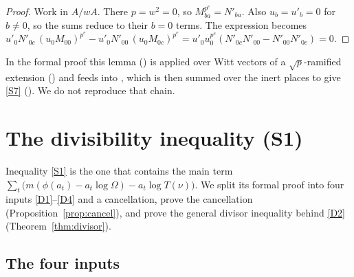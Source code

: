 \documentclass[11pt]{amsart}
\theoremstyle{plain}
\theoremstyle{definition}
\numberwithin{equation}{section}
\begin{document}
\begin{proof}
Work in $A/wA$. There $p=w^2=0$, so $M_{ba}^{p^e}=N'_{ba}$. Also $u_b=u'_b=0$ for $b\ne0$, so the
sums reduce to their $b=0$ terms. The expression becomes
$u'_0N'_{0c}\,(u_0M_{00})^{p^e}-u'_0N'_{00}\,(u_0M_{0c})^{p^e}=u'_0u_0^{p^e}(N'_{0c}N'_{00}-N'_{00}N'_{0c})=0$.
\end{proof}

In the formal proof this lemma () is applied over Witt vectors of a
$\sqrt p$-ramified extension () and feeds into , which is then summed over
the inert places to give \ref{S7} (). We do not reproduce that
chain.
\section{The divisibility inequality (S1)}\label{sec:S1}

Inequality \ref{S1} is the one that contains the main term
$\sum_t\bigl(m(\phi(a_t)-a_t\log\Omega)-a_t\log T(\nu)\bigr)$. We split its formal proof into four
inputs \ref{D1}--\ref{D4} and a cancellation, prove the cancellation
(Proposition~\ref{prop:cancel}), and prove the general divisor inequality behind \ref{D2}
(Theorem~\ref{thm:divisor}).

\subsection{The four inputs}
\end{document}
